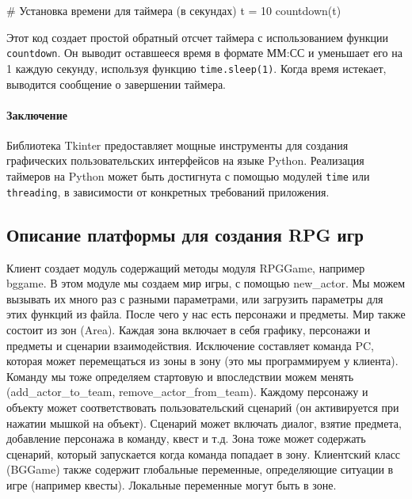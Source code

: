 	\# Установка времени для таймера (в секундах)
	t = 10
	countdown(t)
	
Этот код создает простой обратный отсчет таймера с использованием функции \texttt{countdown}. Он выводит оставшееся время в формате ММ:СС и уменьшает его на 1 каждую секунду, используя функцию \texttt{time.sleep(1)}. Когда время истекает, выводится сообщение о завершении таймера.
	
\paragraph{Заключение}
Библиотека Tkinter предоставляет мощные инструменты для создания графических пользовательских интерфейсов на языке Python. Реализация таймеров на Python может быть достигнута с помощью модулей \texttt{time} или \texttt{threading}, в зависимости от конкретных требований приложения.

\subsection{Описание платформы для создания RPG игр}
Клиент создает модуль содержащий методы модуля RPGGame, например bggame. В этом модуле мы создаем мир игры, с помощью new\_actor. Мы можем вызывать их много раз с разными параметрами, или загрузить параметры для этих функций из файла. После чего у нас есть персонажи и предметы. Мир также состоит из зон (Area). Каждая зона включает в себя графику, персонажи и предметы и сценарии взаимодействия. Исключение составляет команда PC, которая может перемещаться из зоны в зону (это мы программируем у клиента). Команду мы тоже определяем стартовую и впоследствии можем менять (add\_actor\_to\_team, remove\_actor\_from\_team). Каждому персонажу и объекту может соответствовать пользовательский сценарий (он активируется при нажатии мышкой на объект). Сценарий может включать диалог, взятие предмета, добавление персонажа в команду, квест и т.д.
Зона тоже может содержать сценарий, который запускается когда команда попадает в зону.
Клиентский класс (BGGame) также содержит глобальные переменные, определяющие ситуации в игре (например квесты). Локальные переменные могут быть в зоне.

